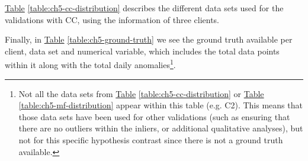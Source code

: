 \hyperref[table:ch5-cc-distribution]{Table} \ref{table:ch5-cc-distribution} describes the different data sets used for the validations with CC, using the information of three clients. 
\begin{table}[h!]
\centering
{}
\caption{Data distribution for CC, which includes the data set size, the period range considered, and the different services.}
\label{table:ch5-cc-distribution}
\end{table}

Finally, in \hyperref[table:ch5-ground-truth]{Table} \ref{table:ch5-ground-truth} we see the ground truth available per client, data set and numerical variable, which includes the total data points within it along with the total daily anomalies\footnote{
Not all the data sets from \hyperref[table:ch5-cc-distribution]{Table} \ref{table:ch5-cc-distribution} or \hyperref[table:ch5-mf-distribution]{Table} \ref{table:ch5-mf-distribution} appear within this table (e.g. C2). This means that those data sets have been used for other validations (such as ensuring that there are no outliers within the inliers, or additional qualitative analyses), but not for this specific hypothesis contrast since there is not a ground truth available.}.

